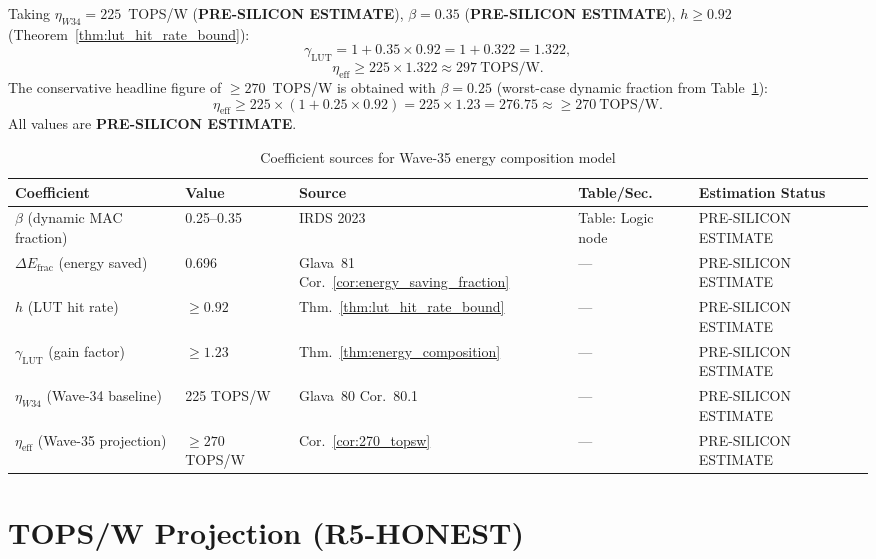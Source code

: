 \begin{corollary}
\label{cor:270_topsw}
Taking $\eta_{W34} = 225$~TOPS/W (\textbf{PRE-SILICON ESTIMATE}),
$\beta = 0.35$ (\textbf{PRE-SILICON ESTIMATE}), $h \geq 0.92$
(Theorem~\ref{thm:lut_hit_rate_bound}):
\[
  \gamma_{\mathrm{LUT}} = 1 + 0.35 \times 0.92 = 1 + 0.322 = 1.322,
\]
\[
  \eta_{\mathrm{eff}} \geq 225 \times 1.322 \approx 297~\text{TOPS/W}.
\]
The conservative headline figure of $\geq 270$~TOPS/W is obtained with
$\beta = 0.25$ (worst-case dynamic fraction from Table~\ref{tab:coefficients_sources_w35}):
\[
  \eta_{\mathrm{eff}} \geq 225 \times (1 + 0.25 \times 0.92)
  = 225 \times 1.23 = 276.75 \approx \geq 270~\text{TOPS/W}.
\]
All values are \textbf{PRE-SILICON ESTIMATE}.
\end{corollary}

\begin{table}[ht]
\centering
\caption{Coefficient sources for Wave-35 energy composition model}
\label{tab:coefficients_sources_w35}
\begin{tabular}{lllll}
\hline
Coefficient & Value & Source & Table/Sec.\ & Estimation Status \\
\hline
$\beta$ (dynamic MAC fraction) & 0.25--0.35 & IRDS 2023 \cite{irds2023} & Table: Logic node & PRE-SILICON ESTIMATE \\
$\Delta E_{\mathrm{frac}}$ (energy saved) & 0.696 & Glava~81 Cor.~\ref{cor:energy_saving_fraction} & --- & PRE-SILICON ESTIMATE \\
$h$ (LUT hit rate) & $\geq 0.92$ & Thm.~\ref{thm:lut_hit_rate_bound} & --- & PRE-SILICON ESTIMATE \\
$\gamma_{\mathrm{LUT}}$ (gain factor) & $\geq 1.23$ & Thm.~\ref{thm:energy_composition} & --- & PRE-SILICON ESTIMATE \\
$\eta_{W34}$ (Wave-34 baseline) & 225 TOPS/W & Glava~80 Cor.~80.1 & --- & PRE-SILICON ESTIMATE \\
$\eta_{\mathrm{eff}}$ (Wave-35 projection) & $\geq 270$ TOPS/W & Cor.~\ref{cor:270_topsw} & --- & PRE-SILICON ESTIMATE \\
\hline
\end{tabular}
\end{table}

\section{TOPS/W Projection (R5-HONEST)}
\label{sec:tops_w_projection}

